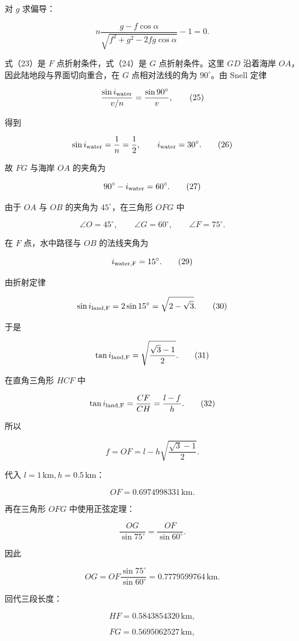 \documentclass[12pt,a4paper,UTF8]{ctexart}
\begin{document}
对 \(g\) 求偏导：

\[
n\frac{g-f\cos\alpha}
{\sqrt{f^2+g^2-2fg\cos\alpha}}-1=0. \tag{24}
\]

式（23）是 \(F\) 点折射条件，式（24）是 \(G\) 点折射条件。这里 \(GD\)
沿着海岸 \(OA\)，因此陆地段与界面切向重合，在 \(G\) 点相对法线的角为
\(90^\circ\)。由 Snell 定律

\[
\frac{\sin i_{\rm water}}{v/n}
=\frac{\sin90^\circ}{v}, \tag{25}
\]

得到

\[
\sin i_{\rm water}=\frac1n=\frac12,
\qquad i_{\rm water}=30^\circ. \tag{26}
\]

故 \(FG\) 与海岸 \(OA\) 的夹角为

\[
90^\circ-i_{\rm water}=60^\circ. \tag{27}
\]

由于 \(OA\) 与 \(OB\) 的夹角为 \(45^\circ\)，在三角形 \(OFG\) 中

\[
\angle O=45^\circ,\qquad
\angle G=60^\circ,\qquad
\angle F=75^\circ. \tag{28}
\]

在 \(F\) 点，水中路径与 \(OB\) 的法线夹角为

\[
i_{\rm water,F}=15^\circ. \tag{29}
\]

由折射定律

\[
\sin i_{\rm land,F}
=2\sin15^\circ
=\sqrt{2-\sqrt3}. \tag{30}
\]

于是

\[
\tan i_{\rm land,F}
=\sqrt{\frac{\sqrt3-1}{2}}. \tag{31}
\]

在直角三角形 \(HCF\) 中

\[
\tan i_{\rm land,F}
=\frac{CF}{CH}
=\frac{l-f}{h}. \tag{32}
\]

所以

\[
\boxed{
f=OF=l-h\sqrt{\frac{\sqrt3-1}{2}}}. \tag{33}
\]

代入 \(l=1\,\mathrm{km},h=0.5\,\mathrm{km}\)：

\[
\boxed{OF=0.6974998331\,\mathrm{km}}. \tag{34}
\]

再在三角形 \(OFG\) 中使用正弦定理：

\[
\frac{OG}{\sin75^\circ}
=\frac{OF}{\sin60^\circ}. \tag{35}
\]

因此

\[
\boxed{
OG=OF\frac{\sin75^\circ}{\sin60^\circ}
=0.7779599764\,\mathrm{km}}. \tag{36}
\]

回代三段长度：

\[
HF=0.5843854320\,\mathrm{km}, \tag{37}
\]

\[
FG=0.5695062527\,\mathrm{km}, \tag{38}
\]
\end{document}
